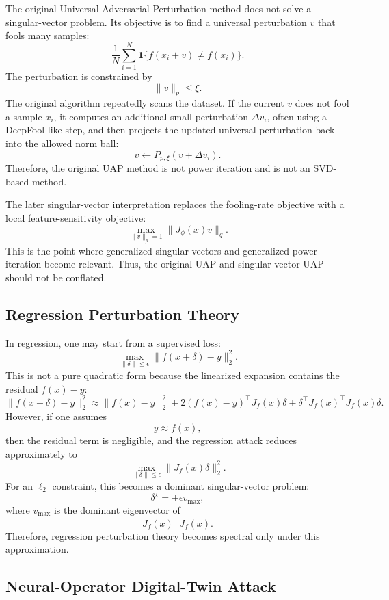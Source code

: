 \documentclass{article}
\begin{document}
The original Universal Adversarial Perturbation method does not solve a singular-vector problem. Its objective is to find a universal perturbation \(v\) that fools many samples:
\[
    \frac{1}{N}
    \sum_{i=1}^N
    \mathbf{1}\{f(x_i+v)\neq f(x_i)\}.
\]
The perturbation is constrained by
\[
    \|v\|_p\le \xi.
\]
The original algorithm repeatedly scans the dataset. If the current \(v\) does not fool a sample \(x_i\), it computes an additional small perturbation \(\Delta v_i\), often using a DeepFool-like step, and then projects the updated universal perturbation back into the allowed norm ball:
\[
    v \leftarrow P_{p,\xi}(v+\Delta v_i).
\]
Therefore, the original UAP method is not power iteration and is not an SVD-based method.

The later singular-vector interpretation replaces the fooling-rate objective with a local feature-sensitivity objective:
\[
    \max_{\|v\|_p=1}
    \|J_\phi(x)v\|_q.
\]
This is the point where generalized singular vectors and generalized power iteration become relevant. Thus, the original UAP and singular-vector UAP should not be conflated.

\subsection{Regression Perturbation Theory}

In regression, one may start from a supervised loss:
\[
    \max_{\|\delta\|\le \epsilon}
    \|f(x+\delta)-y\|_2^2.
\]
This is not a pure quadratic form because the linearized expansion contains the residual \(f(x)-y\):
\[
    \|f(x+\delta)-y\|_2^2
    \approx
    \|f(x)-y\|_2^2
    +
    2(f(x)-y)^\top J_f(x)\delta
    +
    \delta^\top J_f(x)^\top J_f(x)\delta.
\]
However, if one assumes
\[
    y\approx f(x),
\]
then the residual term is negligible, and the regression attack reduces approximately to
\[
    \max_{\|\delta\|\le \epsilon}
    \|J_f(x)\delta\|_2^2.
\]
For an \(\ell_2\) constraint, this becomes a dominant singular-vector problem:
\[
    \delta^\star
    =
    \pm \epsilon v_{\max},
\]
where \(v_{\max}\) is the dominant eigenvector of
\[
    J_f(x)^\top J_f(x).
\]
Therefore, regression perturbation theory becomes spectral only under this approximation.

\subsection{Neural-Operator Digital-Twin Attack}
\end{document}
